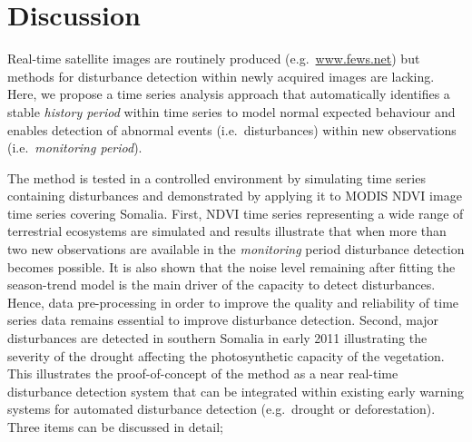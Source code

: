 \documentclass[authoryear,preprint,review,10pt]{elsarticle}
\begin{document}
\section{Discussion} \label{sec:Disc}

Real-time satellite images are routinely produced (e.g.\ \url{www.fews.net}) but methods for disturbance detection within newly acquired images are lacking.
Here, we propose a time series analysis approach that automatically identifies a stable \emph{history period} within time series to model normal expected
behaviour and enables detection of abnormal events (i.e.\ disturbances) within new observations (i.e.\ \emph{monitoring period}).

The method is tested in a controlled environment by simulating time series containing disturbances and demonstrated by applying it to MODIS NDVI
image time series covering Somalia. First, NDVI time series representing a wide range of terrestrial ecosystems are simulated and results illustrate that
when more than two new observations are available in the \emph{monitoring} period disturbance detection becomes possible. It is also shown that the noise level remaining after fitting the season-trend model is the main driver of the capacity to detect disturbances. Hence, data pre-processing in order to improve the quality and reliability of time series data remains essential to improve disturbance detection.
Second, major disturbances are detected in southern Somalia in early 2011 illustrating the severity of the drought affecting the photosynthetic capacity of the vegetation. This illustrates the proof-of-concept of the method as a near real-time disturbance detection system that can be integrated within existing early warning systems for automated disturbance detection (e.g.\ drought or deforestation). Three items can be discussed in detail;
\end{document}
